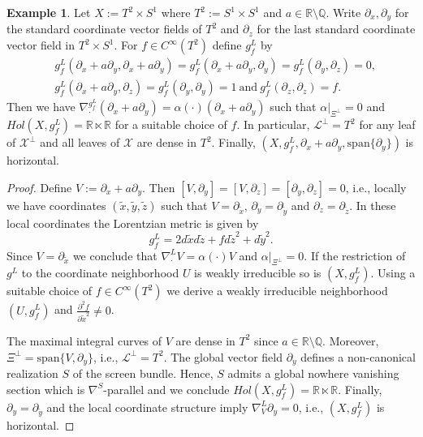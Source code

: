 \documentclass[a4paper,10pt,twoside]{amsart}
\theoremstyle{definition}
\newtheorem{example}[theorem]{Example}
\theoremstyle{remark}
\numberwithin{equation}{section}
\begin{document}
\begin{example}
	Let $X:= T^{2} \times S^{1}$ where $T^{2}:=S^{1}\times S^{1}$ and $a \in {\mathbb{R}} \setminus {\mathbb{Q}}$. Write $\partial_{x},\partial_{y}$ for the standard
	coordinate vector fields of $T^{2}$ and $\partial_{z}$ for the last standard coordinate vector field in $T^{2} \times S^{1}$. For
	$f \in C^{\infty}(T^{2})$ define $g^{L}_{f}$ by
	\begin{align*}
		&g^{L}_{f}(\partial_{x}+a\partial_{y},\partial_{x}+a\partial_{y})=g^{L}_{f}(\partial_{x}+a\partial_{y},\partial_{y})
									=g^{L}_{f}(\partial_{y},\partial_{z}) = 0,\\
		&g^{L}_{f}(\partial_{x}+a\partial_{y},\partial_{z})
			=g^{L}_{f}(\partial_{y},\partial_{y})=1~\text{and}~g^{L}_{f}(\partial_{z},\partial_{z})=f.
	\end{align*}
	Then we have $\nabla^{g^{L}_{f}}_{\cdot}{(\partial_{x}+a\partial_{y})}=\alpha(\cdot)(\partial_{x}+a\partial_{y})$ such that
	$\alpha|_{\Xi^{\perp}}=0$ and $Hol(X,g^{L}_{f})={\mathbb{R}} \ltimes {\mathbb{R}}$ for a suitable choice of $f$.
	In particular, $\mathcal{L}^{\perp}=T^{2}$ for any leaf of $\mathcal{X}^{\perp}$ and all leaves of $\mathcal{X}$ are dense in $T^{2}$.
	Finally, $(X,g^{L}_{f},\partial_{x}+a\partial_{y},\mbox{span}\{\partial_{y}\})$ is horizontal.
\end{example}
\begin{proof}
	Define $V:=\partial_{x}+a\partial_{y}$. Then $[V,\partial_{y}]=[V,\partial_{z}]=[\partial_{y},\partial_{z}]=0$, i.e., locally we
	have coordinates $(\tilde{x},\tilde{y},\tilde{z})$ such that $V=\partial_{\tilde{x}}$, $\partial_{y}=\partial_{\tilde{y}}$ and
	$\partial_{z}=\partial_{\tilde{z}}$. In these local coordinates the Lorentzian metric is given by
	\begin{equation*}
		g^{L}_{f} = 2d\tilde{x}d\tilde{z} + fd\tilde{z}^{2} + d\tilde{y}^{2}.
	\end{equation*}
	Since $V=\partial_{\tilde{x}}$ we conclude that $\nabla^{L}_{\cdot}{V}=\alpha(\cdot)V$ and $\alpha|_{\Xi^{\perp}}=0$. If the restriction of
	$g^{L}$ to the coordinate neighborhood $U$ is weakly irreducible so is $(X,g^{L}_{f})$. Using a suitable choice of $f \in C^{\infty}(T^{2})$ we
	derive a weakly irreducible neighborhood $(U,g^{L}_{f})$ and $\frac{\partial^{2}f}{\partial \tilde{x}^{2}} \neq 0$.\par
	The maximal integral curves of $V$ are dense in $T^{2}$ since $a \in {\mathbb{R}} \setminus {\mathbb{Q}}$. Moreover,
	$\Xi^{\perp}=\mbox{span}\{V,\partial_{y}\}$, i.e., $\mathcal{L}^{\perp}=T^{2}$. The global vector field $\partial_{y}$ defines
	a non-canonical realization $S$ of the screen bundle. Hence, $S$ admits a global nowhere vanishing section which is $\nabla^{S}$-parallel and
	we conclude $Hol(X,g^{L}_{f})={\mathbb{R}} \ltimes {\mathbb{R}}$. Finally, $\partial_{y}=\partial_{\tilde{y}}$ and the local coordinate structure imply
	$\nabla^{L}_{V}{\partial_{y}}=0$, i.e., $(X,g^{L}_{f})$ is horizontal.
\end{proof}
\end{document}

